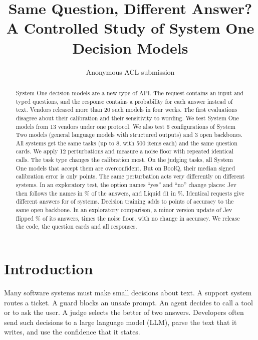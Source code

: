 \documentclass[11pt]{article}
\title{Same Question, Different Answer?\\A Controlled Study of System One Decision Models}
\author{Anonymous ACL submission}
\begin{document}
\maketitle

\begin{abstract}
System One decision models are a new type of API. The request contains an input and typed questions, and the response contains a probability for each answer instead of text. Vendors released more than 20 such models in four weeks. The first evaluations disagree about their calibration and their sensitivity to wording. We test \nSystemOne{} System One models from 13 vendors under one protocol. We also test 6 configurations of System Two models (general language models with structured outputs) and 3 open backbones. All systems get the same tasks (up to 8, with 500 items each) and the same question cards. We apply 12 perturbations and measure a noise floor with repeated identical calls. The task type changes the calibration most. On the judging tasks, all \nTestedJudging{} System One models that accept them are overconfident. But on BoolQ, their median signed calibration error is only \sceMedianKnowledge{} points. The same perturbation acts very differently on different systems. In an exploratory test, the option names ``yes'' and ``no'' change places: Jev then follows the names in \nameswapJev\% of the answers, and Liquid d1 in \nameswapDOne\%. Identical requests give different answers for \nNondeterministic{} of \nEThree{} systems. Decision training adds \gainRangeMin{} to \gainRangeMax{} points of accuracy to the same open backbone. In an exploratory comparison, a minor version update of Jev flipped \flipVersion\% of its answers, \versionOverNoise{} times the noise floor, with no change in accuracy. We release the code, the question cards and all responses.
\end{abstract}

\section{Introduction}

Many software systems must make small decisions about text. A support system routes a ticket. A guard blocks an unsafe prompt. An agent decides to call a tool or to ask the user. A judge selects the better of two answers. Developers often send such decisions to a large language model (LLM), parse the text that it writes, and use the confidence that it states.
\end{document}

